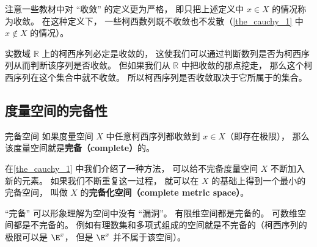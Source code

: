 注意一些教材中对 “收敛” 的定义更为严格， 即只把上述定义中 $x \in X$ 的情况称为收敛。 在这种定义下， 一些柯西数列既不收敛也不发散（\autoref{the_cauchy_1} 中 $x\notin X$ 的情况）。



实数域 $\mathbb R$ 上的柯西序列必定是收敛的， 这使我们可以通过判断数列是否为柯西序列从而判断该序列是否收敛。 但如果我们从 $\mathbb R$ 中把收敛的那点挖走， 那么这个柯西序列在这个集合中就不收敛。 所以柯西序列是否收敛取决于它所属于的集合。 %

\subsection{度量空间的完备性}

\begin{definition}{完备空间}\label{def_cauchy_2}
如果度量空间 $X$ 中任意柯西序列都收敛到 $x\in X$（即存在极限）， 那么该度量空间就是\textbf{完备（complete）}的。
\end{definition}

在\autoref{the_cauchy_1} 中我们介绍了一种方法， 可以给不完备度量空间 $X$ 不断加入新的元素。 如果我们不断重复这一过程， 就可以在 $X$ 的基础上得到一个最小的完备空间， 叫做 $X$ 的\textbf{完备化空间（complete metric space）}。


“完备” 可以形象理解为空间中没有 “漏洞”。 有限维空间都是完备的。 可数维空间都是不完备的。 例如有理数集和多项式组成的空间就是不完备的（柯西序列的极限可以是 $\E^x$， 但是 $\E^x$ 并不属于该空间）。
